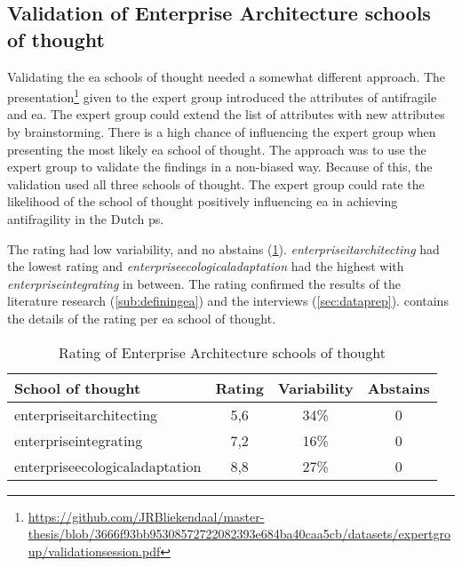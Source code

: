 \subsection{Validation of Enterprise Architecture schools of thought}
\label{sub:validationofeaschools}
Validating the \gls{ea} schools of thought needed a somewhat different approach. The presentation\footnote{\url{https://github.com/JRBliekendaal/master-thesis/blob/3666f93bb95308572722082393e684ba40caa5cb/datasets/expertgroup/validationsession.pdf}} given to the expert group introduced the \glspl{attribute} of \gls{antifragile} and \gls{ea}. The expert group could extend the list of \glspl{attribute} with new \glspl{attribute} by brainstorming. There is a high chance of influencing the expert group when presenting the most likely \gls{ea} school of thought. The approach was to use the expert group to validate the findings in a non-biased way. Because of this, the validation used all three schools of thought. The expert group could rate the likelihood of the school of thought positively influencing \gls{ea} in achieving \gls{antifragility} in the Dutch \gls{ps}. 

The rating had low variability, and no abstains (\cref{tab:validationgscoreeaschools}). \textit{\gls{enterpriseitarchitecting}} had the lowest rating and \textit{\gls{enterpriseecologicaladaptation}} had the highest with \textit{\gls{enterpriseintegrating}} in between. The rating confirmed the results of the literature research (\cref{sub:definingea}) and the interviews (\cref{sec:dataprep}).  contains the details of the rating per \gls{ea} school of thought.
\begin{table}[H]
	\centering
	\begin{tabular}{p{}ccc}
		\toprule
		\textbf{School of thought} & \textbf{Rating} & \textbf{Variability} & \textbf{Abstains} \\
		\midrule%
		\Gls{enterpriseitarchitecting} & 5,6   & 34\%  & 0 \\
		\Gls{enterpriseintegrating} & 7,2   & 16\%  & 0 \\
		\Gls{enterpriseecologicaladaptation} & 8,8   & 27\%  & 0 \\
		\bottomrule%
	\end{tabular}%
	\caption[Rating of Enterprise Architecture schools of thought]{Rating of Enterprise Architecture schools of thought}
	\label{tab:validationgscoreeaschools}
\end{table}%
